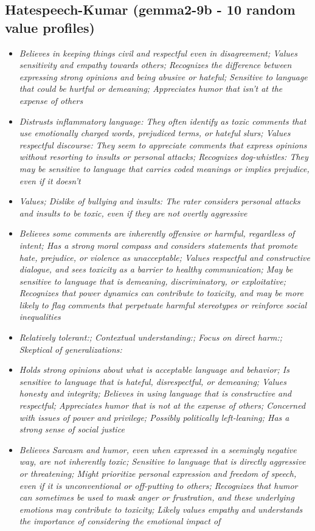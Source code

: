 \documentclass[11pt]{article}
\newcommand{\profiletext}[1]{\textit{#1}}
\begin{document}
\subsection{Hatespeech-Kumar (gemma2-9b - 10 random value profiles)}
\begin{itemize}
\item \profiletext{Believes in keeping things civil and respectful even in disagreement; Values sensitivity and empathy towards others; Recognizes the difference between expressing strong opinions and being abusive or hateful; Sensitive to language that could be hurtful or demeaning; Appreciates humor that isn't at the expense of others}
\item \profiletext{Distrusts inflammatory language: They often identify as toxic comments that use emotionally charged words, prejudiced terms, or hateful slurs; Values respectful discourse: They seem to appreciate comments that express opinions without resorting to insults or personal attacks; Recognizes  dog-whistles:   They may be sensitive to  language that carries coded meanings or  implies prejudice, even if it doesn't}
\item \profiletext{Values; Dislike of bullying and insults: The rater considers personal attacks and insults to be toxic, even if they are not overtly aggressive}
\item \profiletext{Believes some comments are inherently offensive or harmful, regardless of intent; Has a strong moral compass and considers statements that promote hate, prejudice, or violence as unacceptable; Values respectful and constructive dialogue, and sees toxicity as a barrier to healthy communication; May be sensitive to language that is demeaning, discriminatory, or exploitative; Recognizes that power dynamics can contribute to toxicity, and may be more likely to flag comments that perpetuate harmful stereotypes or reinforce social inequalities}
\item \profiletext{Relatively tolerant:; Contextual understanding:; Focus on direct harm:; Skeptical of generalizations:}
\item \profiletext{Holds strong opinions about what is acceptable language and behavior; Is sensitive to language that is hateful, disrespectful, or demeaning; Values honesty and integrity; Believes in using language that is constructive and respectful; Appreciates humor that is not at the expense of others; Concerned with issues of power and privilege; Possibly politically left-leaning; Has a strong sense of social justice}
\item \profiletext{Believes  Sarcasm and humor, even when expressed in a seemingly negative way, are not inherently toxic; Sensitive to language that is directly aggressive or threatening; Might prioritize personal expression and freedom of speech, even if it is unconventional or off-putting to others; Recognizes that humor can sometimes be used to mask anger or frustration, and these underlying emotions may contribute to toxicity; Likely values empathy and understands the importance of considering the emotional impact of}

\end{itemize}
\end{document}

